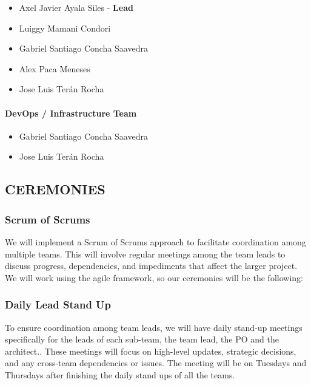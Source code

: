 \begin{itemize}
\tightlist
\item
  Axel Javier Ayala Siles - \textbf{Lead}
\item
  Luiggy Mamani Condori
\item
  Gabriel Santiago Concha Saavedra
\item
  Alex Paca Meneses
\item
  Jose Luis Terán Rocha
\end{itemize}

\paragraph{DevOps / Infrastructure Team}\label{devops-team-7}

\begin{itemize}
\tightlist
\item
  Gabriel Santiago Concha Saavedra
\item
  Jose Luis Terán Rocha
\end{itemize}


\newpage

\hypertarget{ceremonies}{
\subsection{CEREMONIES}\label{ceremonies}}

\hypertarget{scrumofscrums}{
\subsubsection{Scrum of Scrums}\label{scrumofscrums}}

We will implement a Scrum of Scrums approach to facilitate coordination
among multiple teams. This will involve regular meetings among the team
leads to discuss progress, dependencies, and impediments that affect the
larger project.\\
We will work using the agile framework, so our ceremonies will be the
following:~

\hypertarget{dailyleadstandup}{
\subsubsection{Daily Lead Stand Up}\label{dailyleadstandup}}

To ensure coordination among team leads, we will have daily stand-up
meetings specifically for the leads of each sub-team, the team lead, the
PO and the architect.. These meetings will focus on high-level updates,
strategic decisions, and any cross-team dependencies or issues. The
meeting will be on Tuesdays and Thursdays after finishing the daily
stand ups of all the teams.

